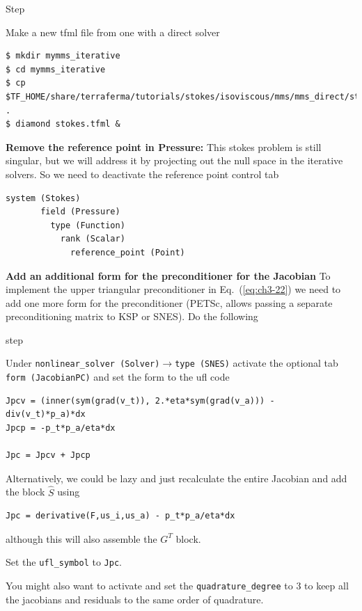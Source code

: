 \begin{steps}{Step}
\item Make a new tfml file from one with a direct solver
  \begin{lstlisting}[style=Bash]
$ mkdir mymms_iterative
$ cd mymms_iterative
$ cp $TF_HOME/share/terraferma/tutorials/stokes/isoviscous/mms/mms_direct/stokes.tfml .
$ diamond stokes.tfml &
  \end{lstlisting}%
\item \textbf{Remove the reference point in Pressure:} This stokes
  problem is still singular, but we will address it by projecting out
  the null space in the iterative solvers.  So we need to deactivate the
  reference point control tab
  \begin{lstlisting}[style=Python]
    system (Stokes)
       field (Pressure)
         type (Function)
           rank (Scalar)
             reference_point (Point)
  \end{lstlisting}
\item \textbf{Add an additional form for the preconditioner for the
    Jacobian} To implement the upper triangular preconditioner in Eq.\
  (\ref{eq:ch3-22}) we need to add one more form for the preconditioner
  (PETSc, allows passing a separate preconditioning matrix to KSP or
  SNES). Do the following
  \begin{steps}{step}
  \item Under \texttt{nonlinear\_solver
    (Solver)}$\rightarrow$\texttt{type (SNES)} activate the optional
  tab \texttt{form (JacobianPC)} and set the form to the ufl code
  \begin{lstlisting}[style=UFL]
Jpcv = (inner(sym(grad(v_t)), 2.*eta*sym(grad(v_a))) - div(v_t)*p_a)*dx
Jpcp = -p_t*p_a/eta*dx

Jpc = Jpcv + Jpcp
  \end{lstlisting}
Alternatively,  we could be lazy and just recalculate the entire
Jacobian and add the  block $\hat{S}$ using
\begin{lstlisting}[style=UFL]
Jpc = derivative(F,us_i,us_a) - p_t*p_a/eta*dx
\end{lstlisting}
although this will also assemble the $G^{T}$ block.
\item Set the \texttt{ufl\_symbol} to
  \texttt{Jpc}.
\item You might also want to activate and set the
  \texttt{quadrature\_degree} to 3 to keep all the jacobians and
  residuals to the same order of quadrature.
  \end{steps}


\end{steps}
